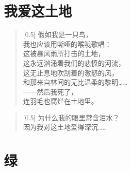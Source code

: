 \documentclass[12pt,UTF-8,openany]{ctexbook}
\begin{document}
\chapter{我爱这土地}

\begin{normalsize}
    
    \begin{verse}[0.5\linewidth]
        假如我是一只鸟， \\
        我也应该用嘶哑的喉咙歌唱： \\
        这被暴风雨所打击的土地， \\
        这永远汹涌着我们的悲愤的河流， \\
        这无止息地吹刮着的激怒的风， \\
        和那来自林间的无比温柔的黎明…… \\
        ——然后我死了， \\
        连羽毛也腐烂在土地里。
    \end{verse}
    
    
    \begin{verse}[0.5\linewidth]
        为什么我的眼里常含泪水？ \\
        因为我对这土地爱得深沉……
    \end{verse}
    
\end{normalsize}



\chapter{绿}
\end{document}
